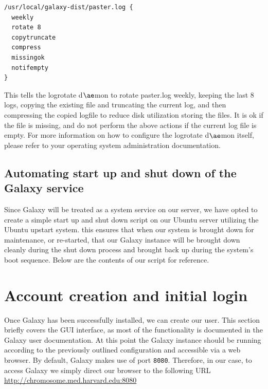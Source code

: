 \documentclass[a4paper,10pt]{article}
\begin{document}
\begin{lstlisting}
/usr/local/galaxy-dist/paster.log {
  weekly
  rotate 8
  copytruncate
  compress
  missingok
  notifempty
}
\end{lstlisting}

This tells the logrotate d$\ae$mon to rotate paster.log weekly, keeping the last 8 logs, copying the existing file and truncating the current log, and then compressing the copied logfile to reduce disk utilization storing the files.  It is ok if the file is missing, and do not perform the above actions if the current log file is empty.  For more information on how to configure the logrotate d$\ae$mon itself, please refer to your operating system administration documentation.

\subsection{Automating start up and shut down of the Galaxy service}
Since Galaxy will be treated as a system service on our server, we have opted to create a simple start up and shut down script on our Ubuntu server utilizing the Ubuntu upstart system.  this ensures that when our system is brought down for maintenance, or re-started, that our Galaxy instance will be brought down cleanly during the shut down process and brought back up during the system's boot sequence.  Below are the contents of our script for reference.



\section{Account creation and initial login}
Once Galaxy has been successfully installed, we can create our user.  This section briefly covers the GUI interface, as most of the functionality is documented in the Galaxy user documentation.
At this point the Galaxy instance should be running according to the previously outlined configuration and accessible via a web browser.
By default, Galaxy makes use of port \texttt{\footnotesize{8080}}. Therefore, in our case, to access Galaxy we simply direct our browser to the following URL \href{http://chromosome.med.harvard.edu:8080}{http://chromosome.med.harvard.edu:8080}
\end{document}
